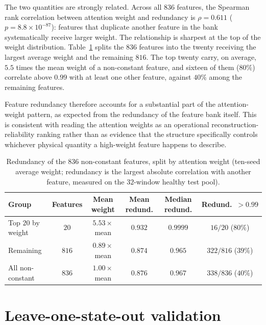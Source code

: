 \documentclass[11pt,a4paper]{article}
\begin{document}
The two quantities are strongly related. Across all $836$ features, the
Spearman rank correlation between attention weight and redundancy is
$\rho=0.611$ ($p=8.8\times10^{-87}$): features that duplicate another
feature in the bank systematically receive larger weight. The relationship
is sharpest at the top of the weight distribution. Table~\ref{tab:redundancy}
splits the $836$ features into the twenty receiving the largest average
weight and the remaining $816$. The top twenty carry, on average, $5.5$
times the mean weight of a non-constant feature, and sixteen of them
($80\%$) correlate above $0.99$ with at least one other feature, against
$40\%$ among the remaining features.

Feature redundancy therefore accounts for a substantial part of the
attention-weight pattern, as expected from the redundancy of the feature
bank itself. This is consistent with reading the attention weights as an
operational reconstruction-reliability ranking rather than as evidence that
the structure specifically controls whichever physical quantity a
high-weight feature happens to describe.

\begin{table}[htbp]
\centering
\caption{Redundancy of the $836$ non-constant features, split by attention
weight (ten-seed average weight; redundancy is the largest absolute
correlation with another feature, measured on the $32$-window healthy test
pool).}
\label{tab:redundancy}
\small
\begin{tabular}{@{}lccccc@{}}
\toprule
\textbf{Group} & \textbf{Features} & \textbf{Mean weight} & \textbf{Mean redund.} & \textbf{Median redund.} & \textbf{Redund.\ $>0.99$} \\
\midrule
Top $20$ by weight   & $20$  & $5.53\times$ mean & $0.932$ & $0.9999$ & $16/20$ ($80\%$) \\
Remaining            & $816$ & $0.89\times$ mean & $0.874$ & $0.965$  & $322/816$ ($39\%$) \\
All non-constant     & $836$ & $1.00\times$ mean & $0.876$ & $0.967$  & $338/836$ ($40\%$) \\
\bottomrule
\end{tabular}
\end{table}

\section{Leave-one-state-out validation}
\label{sec:loso}
\end{document}
